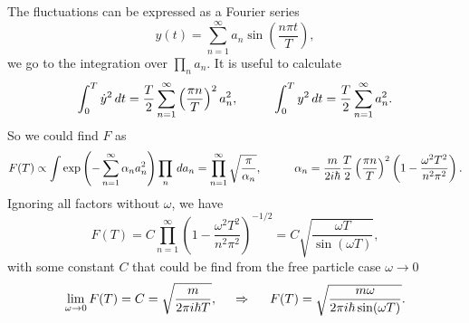 The fluctuations can be expressed as a Fourier series
\begin{equation*}
	y(t) = \sum_{n=1}^{\infty} a_n \sin\left(
		\frac{n \pi t}{T}
	\right),
\end{equation*}
we go to the integration over $\prod_n a_n$. It is useful to calculate
\begin{equation*}
	\int_{0}^{T} \dot{y}^2 \d t = \frac{T}{2} \sum_{n=1}^{\infty} \left(\frac{\pi n}{T}\right)^2 a_n^2,
	\hspace{10 mm} 
	\int_{0}^{T} y^2 \d t = \frac{T}{2} \sum_{n=1}^{\infty} a_n^2.
\end{equation*}
So we could find $F$ as
\begin{equation*}
	F(T) \propto \int \exp\left(
		-\sum_{n=1}^{\infty} \alpha_n  a_n^2
	\right) \prod_n \d a_n = \prod_{n=1}^{\infty} \sqrt{\frac{\pi}{\alpha_n}},
	\hspace{10 mm} 
	\alpha_n = \frac{m}{2 i \hbar}\frac{T}{2} \left(\frac{\pi n}{T}\right)^2 \left(1 - \frac{\omega^2 T^2}{n^2 \pi^2}\right) .
\end{equation*}
Ignoring all factors without $\omega$, we have
\begin{equation*}
	F(T) = C \prod_{n=1}^{\infty} \left(1 -  \frac{\omega^2 T^2}{n^2 \pi^2}\right)^{-1/2} = C \sqrt{\frac{\omega T}{\sin (\omega T)}},
\end{equation*}
with some constant $C$ that could be find from the free particle case $\omega \to 0$
\begin{equation*}
	\lim_{\omega \to 0} F(T) = C = \sqrt{\frac{m}{2\pi i \hbar T}},
	\hspace{0.5cm} \Rightarrow \hspace{0.5cm}	
	F(T) = \sqrt{\frac{m \omega}{2\pi i \hbar \sin(\omega T)}}.
\end{equation*}